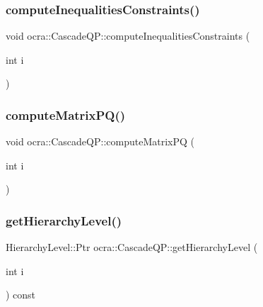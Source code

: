 \hypertarget{classocra_1_1CascadeQP_af5cf5a79077abf0b043f0d47c021599b}{}\label{classocra_1_1CascadeQP_af5cf5a79077abf0b043f0d47c021599b} 
\subsubsection{\texorpdfstring{compute\+Inequalities\+Constraints()}{computeInequalitiesConstraints()}}
{\footnotesize\ttfamily void ocra\+::\+Cascade\+Q\+P\+::compute\+Inequalities\+Constraints (\begin{DoxyParamCaption}\item[{int}]{i }\end{DoxyParamCaption})\hspace{0.3cm}{\ttfamily [protected]}}

\hypertarget{classocra_1_1CascadeQP_a7ce909a63e72212c4f3e97ca6c4b92e3}{}\label{classocra_1_1CascadeQP_a7ce909a63e72212c4f3e97ca6c4b92e3} 
\subsubsection{\texorpdfstring{compute\+Matrix\+P\+Q()}{computeMatrixPQ()}}
{\footnotesize\ttfamily void ocra\+::\+Cascade\+Q\+P\+::compute\+Matrix\+PQ (\begin{DoxyParamCaption}\item[{int}]{i }\end{DoxyParamCaption})\hspace{0.3cm}{\ttfamily [protected]}}

\hypertarget{classocra_1_1CascadeQP_a49b3ce4ed68507905755b63f878c1990}{}\label{classocra_1_1CascadeQP_a49b3ce4ed68507905755b63f878c1990} 
\subsubsection{\texorpdfstring{get\+Hierarchy\+Level()}{getHierarchyLevel()}}
{\footnotesize\ttfamily Hierarchy\+Level\+::\+Ptr ocra\+::\+Cascade\+Q\+P\+::get\+Hierarchy\+Level (\begin{DoxyParamCaption}\item[{int}]{i }\end{DoxyParamCaption}) const}

